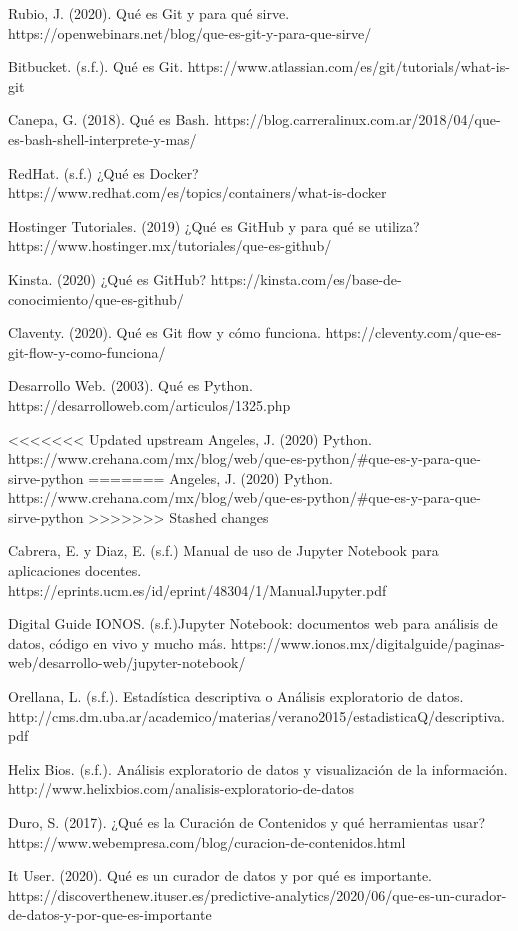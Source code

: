 \documentclass[12pt,letterpaper]{article}
\begin{document}
\begin{thebibliography}{99}

 Rubio, J. (2020). Qu\'e es Git y para qu\'e sirve. https://openwebinars.net/blog/que-es-git-y-para-que-sirve/

 Bitbucket. (s.f.). Qué es Git. https://www.atlassian.com/es/git/tutorials/what-is-git

 Canepa, G. (2018). Qué es Bash. https://blog.carreralinux.com.ar/2018/04/que-es-bash-shell-interprete-y-mas/

 RedHat. (s.f.) ¿Qué es Docker? https://www.redhat.com/es/topics/containers/what-is-docker

  Hostinger Tutoriales. (2019) ¿Qué es GitHub y para qué se utiliza? https://www.hostinger.mx/tutoriales/que-es-github/

 Kinsta. (2020) ¿Qué es GitHub? https://kinsta.com/es/base-de-conocimiento/que-es-github/

 Claventy. (2020). Qué es Git flow y cómo funciona. https://cleventy.com/que-es-git-flow-y-como-funciona/

 Desarrollo Web. (2003). Qué es Python. https://desarrolloweb.com/articulos/1325.php

<<<<<<< Updated upstream
 Angeles, J. (2020) Python. https://www.crehana.com/mx/blog/web/que-es-python/#que-es-y-para-que-sirve-python 
=======
 Angeles, J. (2020) Python. https://www.crehana.com/mx/blog/web/que-es-python/\#que-es-y-para-que-sirve-python 
>>>>>>> Stashed changes

 Cabrera, E. y Diaz, E. (s.f.) Manual de uso de Jupyter Notebook para aplicaciones docentes. 
https://eprints.ucm.es/id/eprint/48304/1/ManualJupyter.pdf

 Digital Guide IONOS. (s.f.)Jupyter Notebook: documentos web para análisis de datos, código en vivo y mucho más. https://www.ionos.mx/digitalguide/paginas-web/desarrollo-web/jupyter-notebook/

 Orellana, L. (s.f.). Estadística descriptiva o Análisis exploratorio de datos. http://cms.dm.uba.ar/academico/materias/verano2015/estadisticaQ/descriptiva.pdf

 Helix Bios. (s.f.). Análisis exploratorio de datos y visualización de la información. http://www.helixbios.com/analisis-exploratorio-de-datos

 Duro, S. (2017). ¿Qué es la Curación de Contenidos y qué herramientas usar? https://www.webempresa.com/blog/curacion-de-contenidos.html

 It User. (2020). Qué es un curador de datos y por qué es importante. https://discoverthenew.ituser.es/predictive-analytics/2020/06/que-es-un-curador-de-datos-y-por-que-es-importante

\end{thebibliography} 
\end{document}
